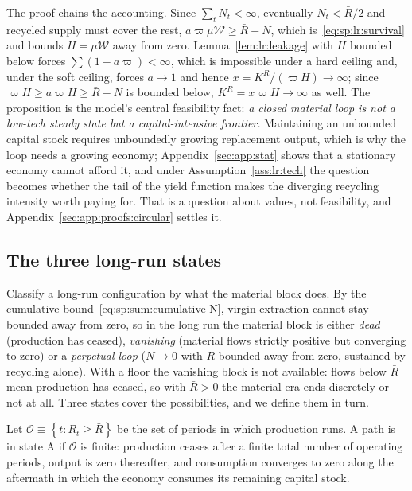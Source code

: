 The proof chains the accounting. Since $\sum_t N_t<\infty$, eventually $N_t<\bar R/2$ and recycled supply must cover the rest, $a\varpi\mu\mathcal W\ge\bar R-N$, which is~\eqref{eq:sp:lr:survival} and bounds $H=\mu\mathcal W$ away from zero. Lemma~\ref{lem:lr:leakage} with $H$ bounded below forces $\sum\left(1-a\varpi\right)<\infty$, which is impossible under a hard ceiling and, under the soft ceiling, forces $a\to1$ and hence $x=K^R/\left(\varpi H\right)\to\infty$; since $\varpi H\ge a\varpi H\ge\bar R-N$ is bounded below, $K^R=x\varpi H\to\infty$ as well. The proposition is the model's central feasibility fact: \emph{a closed material loop is not a low-tech steady state but a capital-intensive frontier.} Maintaining an unbounded capital stock requires unboundedly growing replacement output, which is why the loop needs a growing economy; Appendix~\ref{sec:app:stat} shows that a stationary economy cannot afford it, and under Assumption~\ref{ass:lr:tech} the question becomes whether the tail of the yield function makes the diverging recycling intensity worth paying for. That is a question about values, not feasibility, and Appendix~\ref{sec:app:proofs:circular} settles it.

\subsection{The three long-run states}\label{sec:sp:longrun:class}

Classify a long-run configuration by what the material block does. By the cumulative bound~\eqref{eq:sp:sum:cumulative-N}, virgin extraction cannot stay bounded away from zero, so in the long run the material block is either \emph{dead} (production has ceased), \emph{vanishing} (material flows strictly positive but converging to zero) or a \emph{perpetual loop} ($N\to0$ with $R$ bounded away from zero, sustained by recycling alone). With a floor the vanishing block is not available: flows below $\bar R$ mean production has ceased, so with $\bar R>0$ the material era ends discretely or not at all. Three states cover the possibilities, and we define them in turn.

\begin{definition}\label{def:lr:collapse}
Let $\mathcal O\equiv\left\{t:R_t\ge\bar R\right\}$ be the set of periods in which production runs. A path is in state A if $\mathcal O$ is finite: production ceases after a finite total number of operating periods, output is zero thereafter, and consumption converges to zero along the aftermath in which the economy consumes its remaining capital stock.
\end{definition}

